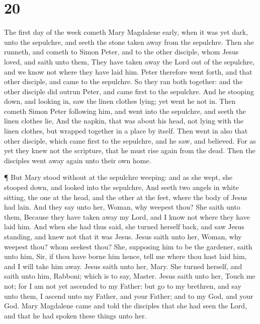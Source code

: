 \hypertarget{section-19}{%
\section{20}\label{section-19}}

 The first day of the week cometh Mary Magdalene early, when
it was yet dark, unto the sepulchre, and seeth the stone taken away from
the sepulchre.  Then she runneth, and cometh to Simon Peter,
and to the other disciple, whom Jesus loved, and saith unto them, They
have taken away the Lord out of the sepulchre, and we know not where
they have laid him.  Peter therefore went forth, and that
other disciple, and came to the sepulchre.  So they ran both
together: and the other disciple did outrun Peter, and came first to the
sepulchre.  And he stooping down, and looking in, saw the
linen clothes lying; yet went he not in.  Then cometh Simon
Peter following him, and went into the sepulchre, and seeth the linen
clothes lie,  And the napkin, that was about his head, not
lying with the linen clothes, but wrapped together in a place by itself.
 Then went in also that other disciple, which came first to
the sepulchre, and he saw, and believed.  For as yet they
knew not the scripture, that he must rise again from the dead.
 Then the disciples went away again unto their own home.

 ¶ But Mary stood without at the sepulchre weeping: and as
she wept, she stooped down, and looked into the sepulchre, 
And seeth two angels in white sitting, the one at the head, and the
other at the feet, where the body of Jesus had lain.  And
they say unto her, Woman, why weepest thou? She saith unto them, Because
they have taken away my Lord, and I know not where they have laid him.
 And when she had thus said, she turned herself back, and
saw Jesus standing, and knew not that it was Jesus.  Jesus
saith unto her, Woman, why weepest thou? whom seekest thou? She,
supposing him to be the gardener, saith unto him, Sir, if thou have
borne him hence, tell me where thou hast laid him, and I will take him
away.  Jesus saith unto her, Mary. She turned herself, and
saith unto him, Rabboni; which is to say, Master.  Jesus
saith unto her, Touch me not; for I am not yet ascended to my Father:
but go to my brethren, and say unto them, I ascend unto my Father, and
your Father; and to my God, and your God.  Mary Magdalene
came and told the disciples that she had seen the Lord, and that he had
spoken these things unto her.

